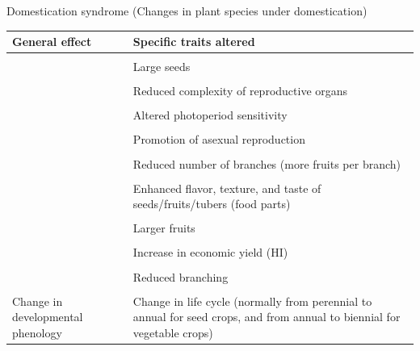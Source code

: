 \documentclass[11pt,ignorenonframetext,aspectratio=169]{beamer}
\begin{document}
\begin{frame}{Domestication syndrome (Changes in plant species under
domestication)}
\protect\hypertarget{domestication-syndrome-changes-in-plant-species-under-domestication}{}
\begin{table}
\centering\begingroup\fontsize{6}{8}\selectfont

\begin{tabular}{>{\raggedright\arraybackslash}p{18em}>{\raggedright\arraybackslash}p{42em}}
\toprule
General effect & Specific traits altered\\
\midrule
\cellcolor{gray!6}{Increased seedling vigor (more plants germinating)} & \cellcolor{gray!6}{Loss of seed or tuber dormancy}\\
 & Large seeds\\
\cellcolor{gray!6}{Modified reproductive system} & \cellcolor{gray!6}{Increased selfing}\\
 & Reduced complexity of reproductive organs\\
\cellcolor{gray!6}{} & \cellcolor{gray!6}{Vegetatively reproducing plants}\\
\addlinespace
 & Altered photoperiod sensitivity\\
\cellcolor{gray!6}{} & \cellcolor{gray!6}{Shift in sex form of species}\\
 & Promotion of asexual reproduction\\
\cellcolor{gray!6}{Increased number of seeds harvested} & \cellcolor{gray!6}{Non-shattering}\\
 & Reduced number of branches (more fruits per branch)\\
\addlinespace
\cellcolor{gray!6}{Increased appeal to consumers} & \cellcolor{gray!6}{Attractive fruit/seed colors and patterns}\\
 & Enhanced flavor, texture, and taste of seeds/fruits/tubers (food parts)\\
\cellcolor{gray!6}{} & \cellcolor{gray!6}{Reduced toxic principles (safer food)}\\
 & Larger fruits\\
\cellcolor{gray!6}{} & \cellcolor{gray!6}{Reduces spikiness}\\
\addlinespace
 & Increase in economic yield (HI)\\
\cellcolor{gray!6}{Altered plant architecture and growth habit} & \cellcolor{gray!6}{Compact growth habit (Determinacy, reduced plant size, dwarfism)}\\
 & Reduced branching\\
\cellcolor{gray!6}{} & \cellcolor{gray!6}{Decreases in variability within a variety}\\
Change in developmental phenology & Change in life cycle (normally from perennial to annual for seed crops, and from annual to biennial for vegetable crops)\\
\bottomrule
\end{tabular}
\endgroup{}
\end{table}
\end{frame}
\end{document}
